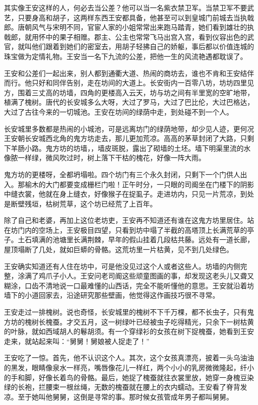 其实像王安这样的人，何必去当公差？他可以当一名紫衣禁卫军。当禁卫军不要武艺，只要身高和胡子，这两样东西王安都具备，他甚至可以到皇城门前城去当执戟郎。唐朝风气与宋明不同，官宦人家的小姐常常出来跑马踏青，她们看到雄壮的执戟郎，就用怀中的果子相赠。郡主、公主也常常飞马出宫入宫，看到仪容出色的武官，就叫他们跟着到她们的密室去，用胡子轻拂自己的娇躯，事后都以价值连城的珠宝做为定情礼物。王安当一名下九流的公差，把他一生的风流艳遇都耽误了。 

王安和公差们一起出来，别人都到通衢大道、热闹的商坊去，谁也不肯和王安结伴而行。他只好和同伴告别，走在坊间的大道上。长安街内一百零八坊，坊坊四里见方，围着三丈高的坊墙，四角的更楼高入云天，坊与坊之间有半里宽的空旷地带，植满了槐树。唐代的长安城多么大呀，大过了罗马，大过了巴比伦，大过巴格达，大过了古往今来的一切城池。王安在坊间的绿荫中走，到处碰不到一个人。 

长安城里多数都是热闹的小城池，可是远离坊门的绿荫地带，却少见人迹，更何况王安朝长安城西北角的鬼方坊走去，那儿更加荒凉。高高的茅草封闭了大路，只剩下羊肠小路。鬼方坊的坊墙，，墙皮斑脱，露出了砌墙的土坯。墙下明渠里流的水像脓一样绿，微风吹过时，树上落下干枯的槐花，好像一阵大雨。 

鬼方坊的更楼呀，全都坍塌啦。四个坊门有三个永久封闭，只剩下一个门供人出入。那榆木的大门都要变成栅栏门啦！正午时分，一只眼的司阍坐在门楼下的阴影中缝衣裳，他就在身上缝衣，好像猴子在捉虱子。走进坊内，只见一片荒凉，到处是断壁残垣，枯树荒草，这个坊已经荒了上百年。 

除了自己和老婆，再加上这位老坊吏，王安再不知道还有谁在这鬼方坊里居住。站在坊门内的空场上，王安极目四望，只看到坊中塌了半截的高塔顶上长满荒草的亭子。土石填满的池塘里长满荆棘，早年的假山挂着几段枯共藤。远处有一道长廊，屋顶塌断了几处，就如巨蟒的骨骼。这荒坊里一片枯黄，见不到几处绿色。 

王安确实知道还有人住在坊中，可是他没见过这个人或者这些人。坊墙的内侧完整，涂满了鸡爪子小人。王安问老司阍这些顽童图画的事，却发现这老头儿又聋又糊涂，口齿不清地说一口最难懂的山西话，完全不能听懂他的意思。王安就沿着坊墙下的小道回家去，沿途研究那些壁画，他觉得这作画技巧很不寻常。 

王安走过一排槐树。说也奇怪，长安城里的槐树不下千万棵，都不长虫子，只有鬼方坊的槐树长槐蚕。才交五月，这一树绿叶已经被虫子吃得精光，只余下一树枯黄的叶脉，就如西域胡人的鬈胡须。有一个穿绿衫的女孩在树下捉槐蚕，她看到王安走来，就站起来叫：“舅舅！舅娘被人捉走了！” 

王安吃了一惊。首先，他不认识这个人。其次，这个女孩真漂亮，披着一头乌油油的黑发，眼睛像泉水一样亮，嘴唇像花儿一样红，两个小小的乳房微微隆起，纤小的手和脚，好像长着鸟的骨骼。最后，她捉了槐蚕就往衣裳里放，她穿一身槐豆染绿的长袍，拦腰束一根丝绳，无数的槐蚕就在腰上的衣内蠕动。王安看了脊背发凉。至于她叫他舅舅，这倒是寻常的事。那时候女孩管成年男子都叫舅舅。 

